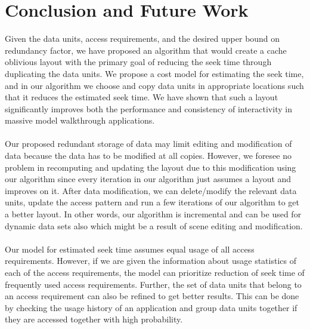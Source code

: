 
\section{Conclusion and Future Work}

Given the data units, access requirements, and the desired upper bound on redundancy factor, we have proposed an algorithm that would create a cache oblivious layout with the primary goal of reducing the seek time through duplicating the data units. We propose a cost model for estimating the seek time, and in our algorithm we choose and copy data units in appropriate locations such that it reduces the estimated seek time.  We have shown that such a layout significantly improves both the performance and consistency of interactivity in massive model walkthrough applications.  \\
\\
Our proposed redundant storage of data may limit editing and modification of data because the data has to be modified at all copies. However, we foresee no problem in recomputing and updating the layout due to this modification using our algorithm since every iteration in our algorithm just assumes a layout and improves on it. After data modification, we can delete/modify the relevant data units, update the access pattern and run a few iterations of our algorithm to get a better layout. In other words, our algorithm is incremental and can be used for dynamic data sets also which might be a result of scene editing and modification.\\
\\
Our model for estimated seek time assumes equal usage of all access requirements. However, if we are given the information about usage statistics of each of the access requirements, the model can prioritize reduction of seek time of frequently used access requirements. Further, the set of data units that belong to an access requirement can also be refined to get better results. This can be done by checking the usage history of an application and group data units together if they are accessed together with high probability.

